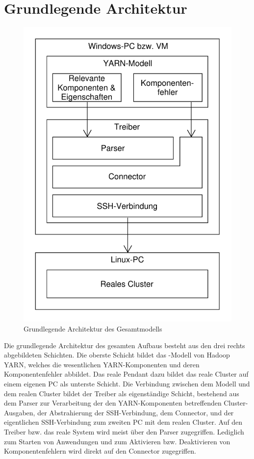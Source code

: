 \section{Grundlegende Architektur}\label{sec:architecture}

\begin{figure}
	\centering
	\includegraphics[width=0.5\columnwidth]{./images/modelArchitecture.pdf}
	\caption{Grundlegende Architektur des Gesamtmodells}
	\label{fig:modelArchitecture}
\end{figure}

Die grundlegende Architektur des gesamten Aufbaus besteht aus den drei rechts abgebildeten Schichten. Die oberste Schicht bildet das \sS-Modell von Hadoop YARN, welches die wesentlichen YARN-Komponenten und deren Komponentenfehler abbildet. Das reale Pendant dazu bildet das reale Cluster auf einem eigenen PC als unterste Schicht. Die Verbindung zwischen dem Modell und dem realen Cluster bildet der Treiber als eigenständige Schicht, bestehend aus dem Parser zur Verarbeitung der den YARN-Komponenten betreffenden Cluster-Ausgaben, der Abstrahierung der SSH-Verbindung, dem Connector, und der eigentlichen SSH-Verbindung zum zweiten PC mit dem realen Cluster. Auf den Treiber bzw. das reale System wird meist über den Parser zugegriffen. Lediglich zum Starten von Anwendungen und zum Aktivieren bzw. Deaktivieren von Komponentenfehlern wird direkt auf den Connector zugegriffen.
